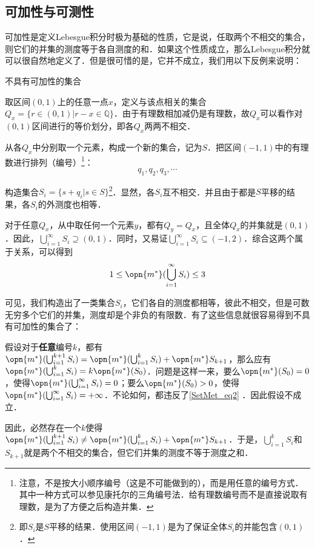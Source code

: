 \subsection{可加性与可测性}

可加性是定义Lebesgue积分时极为基础的性质，它是说，任取两个不相交的集合，则它们的并集的测度等于各自测度的和．如果这个性质成立，那么Lebesgue积分就可以很自然地定义了．但是很可惜的是，它并不成立，我们用以下反例来说明：

\begin{example}{不具有可加性的集合}\label{SetMet_ex1}

取区间$(0, 1)$上的任意一点$x$，定义与该点相关的集合$Q_x=\{r\in(0, 1)|r-x\in\mathbb{Q}\}$．由于有理数相加减仍是有理数，故$Q_x$可以看作对$(0, 1)$区间进行的等价划分，即各$Q_x$两两不相交．

从各$Q_x$中分别取一个元素，构成一个新的集合，记为$S$．把区间$(-1, 1)$中的有理数进行排列（编号）\footnote{注意，不是按大小顺序编号（这是不可能做到的），而是用任意的编号方式．其中一种方式可以参见康托尔的三角编号法．给有理数编号而不是直接说取有理数，是为了方便之后构造并集．}：
\begin{equation}
q_1, q_2, q_3, \cdots 
\end{equation}

构造集合$S_i=\{s+q_i|s\in S\}$\footnote{即$S_i$是$S$平移的结果．使用区间$(-1, 1)$是为了保证全体$S_i$的并能包含$(0, 1)$．}．显然，各$S_i$互不相交．并且由于都是$S$平移的结果，各$S_i$的外测度也相等．

对于任意$Q_x$，从中取任何一个元素$y$，都有$Q_y=Q_x$，且全体$Q_x$的并集就是$(0, 1)$．因此，$\bigcup_{i=1}^\infty S_i\supseteq (0, 1)$．同时，又易证$\bigcup_{i=1}^\infty S_i\subseteq (-1, 2)$．综合这两个属于关系，可以得到
\begin{equation}\label{SetMet_eq2}
1\leq\opn{m^*}(\bigcup_{i=1}^\infty S_i)\leq 3
\end{equation}

可见，我们构造出了一类集合$S_i$，它们各自的测度都相等，彼此不相交，但是可数无穷多个它们的并集，测度却是个非负的有限数．有了这些信息就很容易得到不具有可加性的集合了：

假设对于\textbf{任意}编号$k$，都有$\opn{m^*}(\bigcup_{i=1}^{k+1} S_i)=\opn{m^*}(\bigcup_{i=1}^k S_i)+\opn{m^*}S_{k+1}$，那么应有$\opn{m^*}(\bigcup_{i=1}^{k} S_i)=k\opn{m^*}(S_0)$．问题是这样一来，要么$\opn{m^*}(S_0)=0$，使得$\opn{m^*}(\bigcup_{i=1}^\infty S_i)=0$；要么$\opn{m^*}(S_0)>0$，使得$\opn{m^*}(\bigcup_{i=1}^\infty S_i)=+\infty$．不论如何，都违反了\autoref{SetMet_eq2} ．因此假设不成立．

因此，必然存在一个$k$使得$\opn{m^*}(\bigcup_{i=1}^{k+1} S_i) \neq \opn{m^*}(\bigcup_{i=1}^k S_i)+\opn{m^*}S_{k+1}$．于是，$\bigcup_{i=1}^k S_i$和$S_{k+1}$就是两个不相交的集合，但它们并集的测度不等于测度之和．


\end{example}


